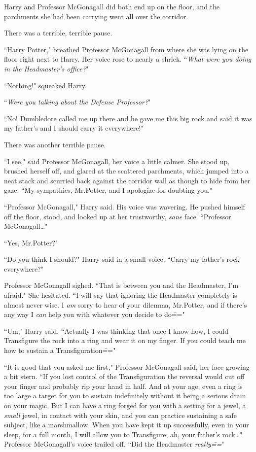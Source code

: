 Harry and Professor McGonagall did both end up on the floor, and the parchments she had been carrying went all over the corridor.

There was a terrible, terrible pause.

``Harry Potter," breathed Professor McGonagall from where she was lying on the floor right next to Harry. Her voice rose to nearly a shriek. ``\emph{What were you doing in the Headmaster's office?}"

``Nothing!" squeaked Harry.

``\emph{Were you talking about the Defense Professor?}"

``No! Dumbledore called me up there and he gave me this big rock and said it was my father's and I should carry it everywhere!"

There was another terrible pause.

``I see," said Professor McGonagall, her voice a little calmer. She stood up, brushed herself off, and glared at the scattered parchments, which jumped into a neat stack and scurried back against the corridor wall as though to hide from her gaze. ``My sympathies, Mr.\?Potter, and I apologize for doubting you."

``Professor McGonagall," Harry said. His voice was wavering. He pushed himself off the floor, stood, and looked up at her trustworthy, \emph{sane} face. ``Professor McGonagall{\ldots}"

``Yes, Mr.\?Potter?"

``Do you think I should?" Harry said in a small voice. ``Carry my father's rock everywhere?"

Professor McGonagall sighed. ``That is between you and the Headmaster, I'm afraid." She hesitated. ``I will say that ignoring the Headmaster completely is almost never wise. I \emph{am} sorry to hear of your dilemma, Mr.\?Potter, and if there's any way I \emph{can} help you with whatever you decide to do\==="

``Um," Harry said. ``Actually I was thinking that once I know how, I could Transfigure the rock into a ring and wear it on my finger. If you could teach me how to sustain a Transfiguration\==="

``It is good that you asked me first," Professor McGonagall said, her face growing a bit stern. ``If you lost control of the Transfiguration the reversal would cut off your finger and probably rip your hand in half. And at your age, even a ring is too large a target for you to sustain indefinitely without it being a serious drain on your magic. But I can have a ring forged for you with a setting for a jewel, a \emph{small} jewel, in contact with your skin, and you can practice sustaining a safe subject, like a marshmallow. When you have kept it up successfully, even in your sleep, for a full month, I will allow you to Transfigure, ah, your father's rock{\ldots}" Professor McGonagall's voice trailed off. ``Did the Headmaster \emph{really\===}"

